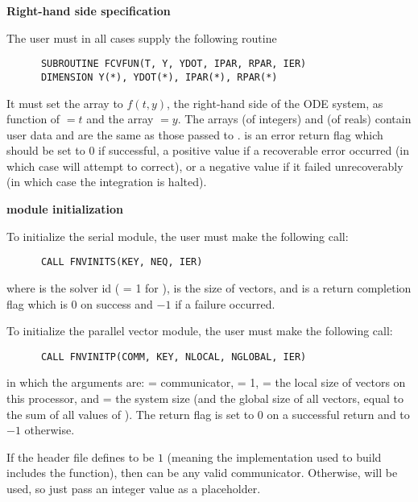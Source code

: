\begin{Steps}
  
\item {\bf Right-hand side specification}
  
  The user must in all cases supply the following {\F} routine
\begin{verbatim}
      SUBROUTINE FCVFUN(T, Y, YDOT, IPAR, RPAR, IER)
      DIMENSION Y(*), YDOT(*), IPAR(*), RPAR(*)
\end{verbatim}
  It must set the  array to $f(t,y)$, the right-hand side of the ODE
  system, as function of $=t$ and the array $=y$.  
  The arrays  (of integers) and  (of reals) contain user data
  and are the same as those passed to .
   is an error return flag which should be set to $0$ if successful, a positive
  value if a recoverable error occurred (in which case {\cvode} will attempt to correct), 
  or a negative value if it failed unrecoverably (in which case the integration is 
  halted).

\item  {\bf {\nvector} module initialization}

  {\s} To initialize the serial {\nvector} module, the user must make the
  following call:
\begin{verbatim}
      CALL FNVINITS(KEY, NEQ, IER)
\end{verbatim}
  where 
   is the solver id ( = 1 for {\cvode}),
   is the size of vectors, and
   is a  return completion flag which is $0$ on success and $-1$ 
  if a failure occurred.
  
  {\p} To initialize the parallel vector module, the user must make the
  following call:
\begin{verbatim}
      CALL FNVINITP(COMM, KEY, NLOCAL, NGLOBAL, IER)
\end{verbatim}
  in which the arguments are:  = {\mpi} communicator,
   = 1,  = the local size of
  vectors on this processor, and  = the system size (and the global
  size of all vectors, equal to the sum of all values of ).
  The return flag  is set to $0$ on a successful return and to $-1$
  otherwise.

  {\warn}If the header file  defines
   to be $1$ (meaning the {\mpi}
  implementation used to build {\sundials} includes the
   function), then  can be any valid
  {\mpi} communicator. Otherwise,  will be used, so
  just pass an integer value as a placeholder.


\end{Steps}
